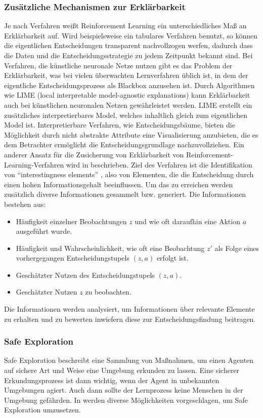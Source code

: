 \subsubsection{Zusätzliche Mechanismen zur Erklärbarkeit}
Je nach Verfahren weißt Reinforcement Learning ein unterschiedliches Maß an Erklärbarkeit auf.
Wird beispielsweise ein tabulares Verfahren benutzt, so können die eigentlichen Entscheidungen transparent nachvollzogen werfen, dadurch dass die Daten und die Entscheidungsstrategie zu jedem Zeitpunkt bekannt sind.
Bei Verfahren, die künstliche neuronale Netze \cite[S. 187]{sutton2018} nutzen gibt es das Problem der Erklärbarkeit, was bei vielen überwachten Lernverfahren üblich ist, in dem der eigentliche Entscheidungsprozess als Blackbox anzusehen ist.
Durch Algorithmen wie LIME (local interpretable model-agnostic explanations) \cite{ribeiro2016} kann Erklärbarkeit auch bei künstlichen neuronalen Netzen gewährleistet werden.
LIME erstellt ein zusätzliches interpretierbares Model, welches inhaltlich gleich zum eigentlichen Model ist.
Interpretierbare Verfahren, wie Entscheidungsbäume, bieten die Möglichkeit durch nicht abstrakte Attribute eine Visualisierung anzubieten, die es dem Betrachter ermöglicht die Entscheidungsgrundlage nachzuvollziehen.
\ab 
Ein anderer Ansatz für die Zusicherung von Erklärbarkeit von Reinforcement-Learning-Verfahren wird in \cite{sequeira2019} beschrieben.
Ziel des Verfahren ist die Identifikation von \enquote{interestingness elements} \cite[S. 2]{sequeira2019}, also von Elementen, die die Entscheidung durch einen hohen Informationsgehalt beeinflussen.
Um das zu erreichen werden zusätzlich diverse Informationen gesammelt bzw. generiert.
Die Informationen bestehen aus:
\begin{itemize}
    \item Häufigkeit einzelner Beobachtungen $z$ und wie oft daraufhin eine Aktion $a$ ausgeführt wurde.
    \item Häufigkeit und Wahrscheinlichkeit, wie oft eine Beobachtung $z'$ als Folge eines vorhergegangen Entscheidungstupels $(z, a)$ erfolgt ist.
    \item Geschätzter Nutzen des Entscheidungstupels $(z, a)$.
    \item Geschätzter Nutzen $z$ zu beobachten.
\end{itemize}
Die Informationen werden analysiert, um Informationen über relevante Elemente zu erhalten und zu bewerten inwiefern diese zur Entscheidungsfindung beitragen.

\subsubsection{Safe Exploration}
Safe Exploration beschreibt eine Sammlung von Maßnahmen, um einen Agenten auf sichere Art und Weise eine Umgebung erkunden zu lassen.
Eine sicherer Erkundungsprozess ist dann wichtig, wenn der Agent in unbekannten Umgebungen agiert. 
Auch dann sollte der Lernprozess keine Menschen in der Umgebung gefährden.
In \cite[S. 14 ff.]{amodei2016} werden diverse Möglichkeiten vorgeschlagen, um Safe Exploration umzusetzen.

